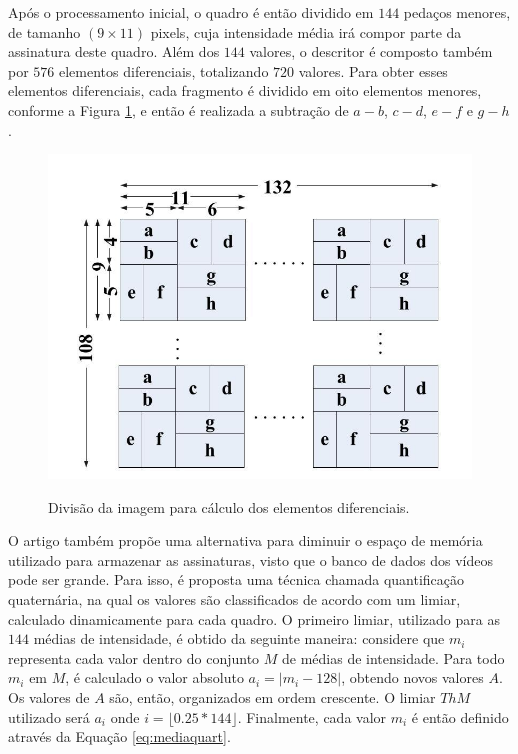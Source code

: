 Após o processamento inicial, o quadro é então dividido em $144$ pedaços menores, de tamanho $(9\times11)$ pixels, cuja intensidade média irá compor parte da assinatura deste quadro. Além dos $144$ valores, o descritor é composto também por $576$ elementos diferenciais, totalizando $720$ valores. Para obter esses elementos diferenciais, cada fragmento é dividido em oito elementos menores, conforme a Figura \ref{fig:divsceneframe}, e então é realizada a subtração de $a - b$, $c - d$, $e - f$ e $g - h$.

\begin{figure}[h]
  \centering
    \caption{Divisão da imagem para cálculo dos elementos diferenciais.} 
    \includegraphics[width=\textwidth]{dados/figuras/sf_division.png}
    \label{fig:divsceneframe}
\end{figure}

O artigo também propõe uma alternativa para diminuir o espaço de memória utilizado para armazenar as assinaturas, visto que o banco de dados dos vídeos pode ser grande. Para isso, é proposta uma técnica chamada quantificação quaternária, na qual os valores são classificados de acordo com um limiar, calculado dinamicamente para cada quadro. O primeiro limiar, utilizado para as $144$ médias de intensidade, é obtido da seguinte maneira: considere que $m_i$ representa cada valor dentro do conjunto $M$ de médias de intensidade. Para todo $m_i$ em $M$, é calculado o valor absoluto $a_i = \lvert m_i - 128 \rvert$, obtendo novos valores $A$. Os valores de $A$ são, então, organizados em ordem crescente. O limiar $ThM$ utilizado será $a_i$ onde $i = \lfloor 0.25*144 \rfloor$. Finalmente, cada valor $m_i$ é então definido através da Equação \ref{eq:mediaquart}.


